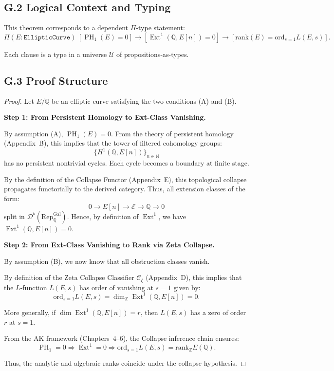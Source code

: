 \documentclass[11pt]{article}
\DeclareMathOperator{\Ext}{Ext}
\DeclareMathOperator{\PH}{PH}
\newcommand{\QQ}{\mathbb{Q}}
\newcommand{\ZZ}{\mathbb{Z}}
\begin{document}
\subsection*{G.2 Logical Context and Typing}

This theorem corresponds to a dependent $\Pi$-type statement:
\[
\Pi (E : \texttt{EllipticCurve})\;
[\PH_1(E) = 0] \to [\Ext^1(\QQ,E[n]) = 0] \to [\mathrm{rank}(E) = \mathrm{ord}_{s=1} L(E,s)].
\]

Each clause is a type in a universe $\mathcal{U}$ of propositions-as-types.

\subsection*{G.3 Proof Structure}

\begin{proof}
Let $E/\QQ$ be an elliptic curve satisfying the two conditions (A) and (B).

\vspace{1em}
\noindent \textbf{Step 1: From Persistent Homology to Ext-Class Vanishing.}

By assumption (A), $\PH_1(E) = 0$.  
From the theory of persistent homology (Appendix~B), this implies that the tower of filtered cohomology groups:
\[
\{H^1(\QQ, E[n])\}_{n \in \mathbb{N}}
\]
has no persistent nontrivial cycles. Each cycle becomes a boundary at finite stage.

By the definition of the Collapse Functor (Appendix~E), this topological collapse propagates functorially to the derived category.  
Thus, all extension classes of the form:
\[
0 \to E[n] \to \mathcal{E} \to \QQ \to 0
\]
split in $\mathcal{D}^b(\mathrm{Rep}_{\QQ}^{\mathrm{Gal}})$.  
Hence, by definition of $\Ext^1$, we have $\Ext^1(\QQ,E[n]) = 0$.

\vspace{1em}
\noindent \textbf{Step 2: From Ext-Class Vanishing to Rank via Zeta Collapse.}

By assumption (B), we now know that all obstruction classes vanish.

By definition of the Zeta Collapse Classifier $\mathcal{C}_\zeta$ (Appendix~D),  
this implies that the $L$-function $L(E,s)$ has order of vanishing at $s=1$ given by:
\[
\mathrm{ord}_{s=1} L(E,s) = \dim_{\ZZ} \Ext^1(\QQ, E[n]) = 0.
\]

More generally, if $\dim \Ext^1(\QQ,E[n]) = r$, then $L(E,s)$ has a zero of order $r$ at $s = 1$.

From the AK framework (Chapters~4–6), the Collapse inference chain ensures:
\[
\PH_1 = 0 \Rightarrow \Ext^1 = 0 \Rightarrow \mathrm{ord}_{s=1} L(E,s) = \mathrm{rank}_{\ZZ} E(\QQ).
\]

Thus, the analytic and algebraic ranks coincide under the collapse hypothesis.

\end{proof}
\end{document}
